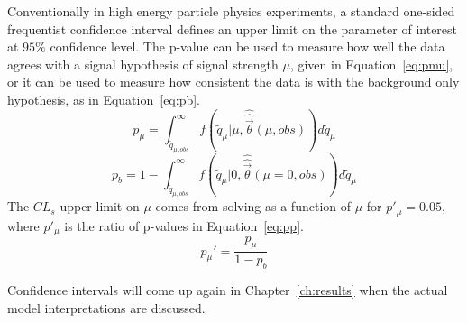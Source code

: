 Conventionally in high energy particle physics experiments, a standard one-sided frequentist confidence interval defines an upper limit on the parameter of interest at $95\%$ confidence level.  The p-value can be used to measure how well the data agrees with a signal hypothesis of signal strength $\mu$, given in Equation~\ref{eq:pmu}, or it can be used to measure how consistent the data is with the background only hypothesis, as in Equation~\ref{eq:pb}.
\begin{equation}
p_\mu=\int_{\tilde{q}_{\mu,obs}}^\infty f(\tilde{q}_\mu|\mu,\hat{\hat{\vec{\theta}}}(\mu,obs)) d\tilde{q}_\mu
\label{eq:pmu}
\end{equation}
\begin{equation}
p_b=1-\int_{\tilde{q}_{\mu,obs}}^\infty f(\tilde{q}_\mu|0,\hat{\hat{\vec{\theta}}}(\mu=0,obs)) d\tilde{q}_\mu
\label{eq:pb}
\end{equation}
The $CL_s$ upper limit on $\mu$ comes from solving as a function of $\mu$ for $p'_\mu=0.05$, where $p'_\mu$ is the ratio of p-values in Equation~\ref{eq:pp}.
\begin{equation}
p_\mu ' = \frac{p_\mu}{1-p_b}
\end{equation}

Confidence intervals will come up again in Chapter~\ref{ch:results} when the actual model interpretations are discussed.



